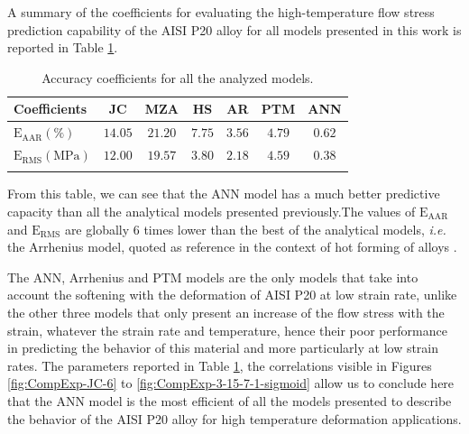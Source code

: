 \documentclass[twoside,english,1p,final,sort&compress]{elsarticle}
\makeatletter
\theoremstyle{plain}
\DeclareRobustCommand{\ie}{\emph{i.e.}\@\xspace}
\DeclareRobustCommand{\RMSE}{\text{E}_\text{RMS}}
\DeclareRobustCommand{\AARE}{\text{E}_\text{AAR}}
\makeatother
\begin{document}
A summary of the coefficients for evaluating the high-temperature flow stress prediction capability of the AISI P20 alloy for all models presented in this work is reported in Table \ref{tab:Errors}.
\begin{table}[h!]
\centering
\caption{Accuracy coefficients for all the analyzed models.}
\begin{tabular}{lcccccc}
\hline
Coefficients & JC & MZA & HS & AR & PTM & ANN\\
\hline
$\AARE(\%)$ & $14.05$ & $21.20$ & $7.75$ & $3.56$ & $4.79$ & $0.62$\\
$\RMSE(\text{MPa})$ & $12.00$ & $19.57$ & $3.80$ & $2.18$ & $4.59$ & $0.38$\\
\hline
\label{tab:Errors}
\end{tabular}
\end{table}
From this table, we can see that the ANN model has a much better predictive capacity than all the analytical models presented previously.The values of $\AARE$ and $\RMSE$ are globally $6$ times lower than the best of the analytical models, \ie the Arrhenius model, quoted as reference in the context of hot forming of alloys \cite{Liang-2022}.

The ANN, Arrhenius and PTM models are the only models that take into account the softening with the deformation of AISI P20 at low strain rate, unlike the other three models that only present an increase of the flow stress with the strain, whatever the strain rate and temperature, hence their poor performance in predicting the behavior of this material and more particularly at low strain rates.
The parameters reported in Table \ref{tab:Errors}, the correlations visible in Figures \ref{fig:CompExp-JC-6} to \ref{fig:CompExp-3-15-7-1-sigmoid} allow us to conclude here that the ANN model is the most efficient of all the models presented to describe the behavior of the AISI P20 alloy for high temperature deformation applications.

\end{document}
